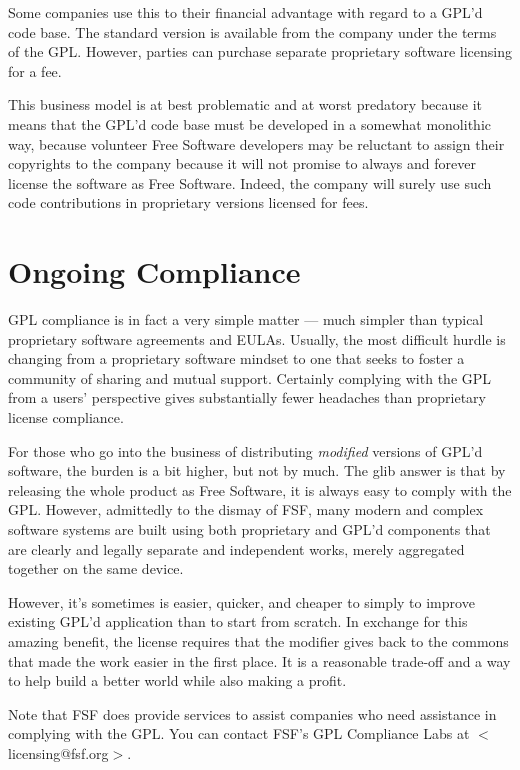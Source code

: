 Some companies use this to their
financial advantage with regard to a GPL'd code base. The standard
version is available from the company under the terms of the GPL\@.
However, parties can purchase separate proprietary software licensing for
a fee.

This business model is at best problematic and at worst predatory because it means that the GPL'd code
base must be developed in a somewhat monolithic way, because volunteer
Free Software developers may be reluctant to assign their copyrights to
the company because it will not promise to always and forever license the
software as Free Software. Indeed, the company will surely use such code
contributions in proprietary versions licensed for fees.

\section{Ongoing Compliance}

GPL compliance is in fact a very simple matter --- much simpler than
typical proprietary software agreements and EULAs. Usually, the most
difficult hurdle is changing from a proprietary software mindset to one
that seeks to foster a community of sharing and mutual support. Certainly
complying with the GPL from a users' perspective gives substantially fewer
headaches than proprietary license compliance.

For those who go into the business of distributing {\em modified}
versions of GPL'd software, the burden is a bit higher, but not by
much. The glib answer is that by releasing the whole product as Free
Software, it is always easy to comply with the GPL. However,
admittedly to the dismay of FSF, many modern and complex software
systems are built using both proprietary and GPL'd components that are
clearly and legally separate and independent works, merely aggregated
together on the same device.

However, it's sometimes is easier, quicker, and cheaper to simply to
improve existing GPL'd application than to start from scratch.  In
exchange for this amazing benefit, the license requires that the modifier gives
back to the commons that made the work easier in the first place. It is a
reasonable trade-off and a way to help build a better world while also
making a profit.

Note that FSF does provide services to assist companies who need
assistance in complying with the GPL. You can contact FSF's GPL
Compliance Labs at $<$licensing@fsf.org$>$.


